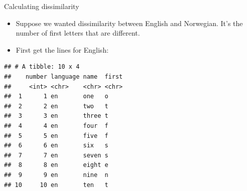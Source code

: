 \documentclass[ignorenonframetext,]{beamer}
\newenvironment{Shaded}{\begin{snugshade}}{\end{snugshade}}
\newcommand{\KeywordTok}[1]{\textcolor[rgb]{0.13,0.29,0.53}{\textbf{#1}}}
\newcommand{\NormalTok}[1]{#1}
\newcommand{\OperatorTok}[1]{\textcolor[rgb]{0.81,0.36,0.00}{\textbf{#1}}}
\newcommand{\StringTok}[1]{\textcolor[rgb]{0.31,0.60,0.02}{#1}}
\begin{document}
\begin{frame}[fragile]{Calculating dissimilarity}
\protect\hypertarget{calculating-dissimilarity}{}

\begin{itemize}
\item
  Suppose we wanted dissimilarity between English and Norwegian. It's
  the number of first letters that are different.
\item
  First get the lines for English:
\end{itemize}

\scriptsize

\begin{Shaded}
\end{Shaded}

\begin{verbatim}
## # A tibble: 10 x 4
##    number language name  first
##     <int> <chr>    <chr> <chr>
##  1      1 en       one   o    
##  2      2 en       two   t    
##  3      3 en       three t    
##  4      4 en       four  f    
##  5      5 en       five  f    
##  6      6 en       six   s    
##  7      7 en       seven s    
##  8      8 en       eight e    
##  9      9 en       nine  n    
## 10     10 en       ten   t
\end{verbatim}

\normalsize

\end{frame}
\end{document}
